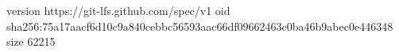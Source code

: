 version https://git-lfs.github.com/spec/v1
oid sha256:75a17aacf6d10c9a840cebbc56593aac66df09662463c0ba46b9abec0e446348
size 62215
